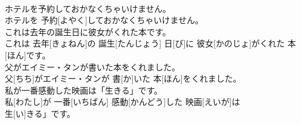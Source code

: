 \documentclass[8pt]{extreport}
\begin{document}
\begin{CJK}{UTF8}{min}
\\	ホテルを予約しておかなくちゃいけません。	
\\	ホテルを 予約[よやく]しておかなくちゃいけません。	
\\	これは去年の誕生日に彼女がくれた本です。	
\\	これは 去年[きょねん]の 誕生[たんじょう] 日[び]に 彼女[かのじょ]がくれた 本[ほん]です。	
\\	父がエイミー・タンが書いた本をくれました。	
\\	父[ちち]がエイミー・タンが 書[か]いた 本[ほん]をくれました。	
\\	私が一番感動した映画は「生きる」です。	
\\	私[わたし]が 一番[いちばん] 感動[かんどう]した 映画[えいが]は
\\	生[い]きる」です。	
\end{CJK}
\end{document}
